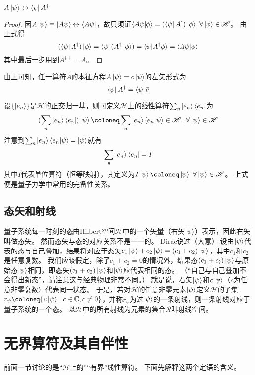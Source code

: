 \begin{theorem}
    $A\ket{\psi} \leftrightarrow \bra{\psi}A^\dagger$
\end{theorem}

\begin{proof}
    因$A\ket{\psi} \equiv \ket{A\psi} \leftrightarrow \bra{A\psi}$，故只须证$\braket{A\psi | \phi} = (\bra{\psi}A^\dagger)\ket{\phi} ~ \forall \ket{\phi} \in \mathscr{H}$。
    由上式得
    $$(\bra{\psi}A^\dagger)\ket{\phi} = \bra{\psi}(A^\dagger\ket{\phi}) = \braket{\psi | A^\dagger\phi} = \braket{A\psi | \phi}$$
    其中最后一步用到$A^{\dagger\dagger} = A$。
\end{proof}

由上可知，任一算符$A$的本征方程$A\ket{\psi} = c\ket{\psi}$的左矢形式为
$$\bra{\psi}A^\dagger = \bra{\psi}\bar{c}$$

设$\{\ket{e_n}\}$是$\mathscr{H}$的正交归一基，则可定义$\mathscr{H}$上的线性算符$\sum_n\ket{e_n}\bra{e_n}$为
$$(\sum_n\ket{e_n}\bra{e_n})\ket{\psi} \coloneq \sum_n\ket{e_n}\braket{e_n | \psi} \in \mathscr{H}, ~ \forall \ket{\psi} \in \mathscr{H}$$
注意到$\sum_n\ket{e_n}\braket{e_n | \psi} = \ket{\psi}$就有
$$\sum_n\ket{e_n}\bra{e_n} = I$$
其中$I$代表单位算符（恒等映射），其定义为$I\ket{\psi} \coloneq \ket{\psi} ~ \forall \ket{\psi} \in \mathscr{H}$。
上式便是量子力学中常用的完备性关系。

\subsection{态矢和射线}

量子系统每一时刻的态由Hilbert空间$\mathscr{H}$中的一个矢量（右矢$\ket{\psi}$）表示，因此右矢叫做态矢。
然而态矢与态的对应关系不是一一的。
Dirac说过（大意）:设由$\ket{\psi}$代表的态与自己叠加，结果将对应于态矢$c_1\ket{\psi} + c_2\ket{\psi} = (c_1 + c_2)\ket{\psi}$，其中$c_1$和$c_2$是任意复数。
我们应该假定，除了$c_1 + c_2 = 0$的情况外，结果态$(c_1 + c_2)\ket{\psi}$与原始态$\ket{\psi}$相同，即态矢$(c_1 + c_2)\ket{\psi}$和$\ket{\psi}$应代表相同的态。
（``自己与自己叠加不会得出新态''，请注意这与经典物理非常不同。）
就是说，右矢$\ket{\psi}$和$c\ket{\psi}$（$c$为任意非零复数）代表同一状态。
于是，若对$\mathscr{H}$的任意非零元素$\ket{\psi}$定义$\mathscr{H}$的子集$r_\psi \coloneq \{c\ket{\psi} \mid c \in \mathbb{C}, c \neq 0\}$，并称$r_\psi$为过$\ket{\psi}$的一条射线，则一条射线对应于量子系统的一个态。
以$\mathscr{H}$中的所有射线为元素的集合$\mathscr{R}$叫射线空间。

\section{无界算符及其自伴性}

前面一节讨论的是``$\mathscr{H}$上的''``有界''线性算符。
下面先解释这两个定语的含义。


